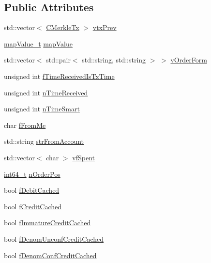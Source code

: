 \subsection*{Public Attributes}
\begin{DoxyCompactItemize}
\item 
std\+::vector$<$ \hyperlink{class_c_merkle_tx}{C\+Merkle\+Tx} $>$ \hyperlink{class_c_wallet_tx_ae122d2e0ce296bd9dfc63eb3ede5ce98}{vtx\+Prev}
\item 
\hyperlink{wallet_8h_ab1e69952accb0e7c635e4d7f2b19802b}{map\+Value\+\_\+t} \hyperlink{class_c_wallet_tx_a17229eca0c81245312115a9c333203d8}{map\+Value}
\item 
std\+::vector$<$ std\+::pair$<$ std\+::string, std\+::string $>$ $>$ \hyperlink{class_c_wallet_tx_a923dbbba343b8f4d1c3d89ae73bdcea0}{v\+Order\+Form}
\item 
unsigned int \hyperlink{class_c_wallet_tx_ac058c61be3a1c680a3ad384ff04d27eb}{f\+Time\+Received\+Is\+Tx\+Time}
\item 
unsigned int \hyperlink{class_c_wallet_tx_af4f4b58875061467026da7b259532b69}{n\+Time\+Received}
\item 
unsigned int \hyperlink{class_c_wallet_tx_a3c9ba52ce7203b9f16235785a09c383c}{n\+Time\+Smart}
\item 
char \hyperlink{class_c_wallet_tx_a1598bf4a18fd05ce5eaaa0c3eb58ff28}{f\+From\+Me}
\item 
std\+::string \hyperlink{class_c_wallet_tx_a099b5ca562f8a8378124b345b9123f25}{str\+From\+Account}
\item 
std\+::vector$<$ char $>$ \hyperlink{class_c_wallet_tx_a32c09e049302518c81f80c4f1f85583b}{vf\+Spent}
\item 
\hyperlink{stdint_8h_adec1df1b8b51cb32b77e5b86fff46471}{int64\+\_\+t} \hyperlink{class_c_wallet_tx_af51e160ff1d9d78986e9f239c7ac7a35}{n\+Order\+Pos}
\item 
bool \hyperlink{class_c_wallet_tx_ad2dca68c99f2e677e5999c9872a269da}{f\+Debit\+Cached}
\item 
bool \hyperlink{class_c_wallet_tx_ad896ca73e00251f900185a1114c3c506}{f\+Credit\+Cached}
\item 
bool \hyperlink{class_c_wallet_tx_a9f52bb55d93a7ffe20e93a4f12487815}{f\+Immature\+Credit\+Cached}
\item 
bool \hyperlink{class_c_wallet_tx_a11197a5edda9bbfa66fe94eab1329a51}{f\+Denom\+Unconf\+Credit\+Cached}
\item 
bool \hyperlink{class_c_wallet_tx_a73a6308df83f13853a1891ef67c2d199}{f\+Denom\+Conf\+Credit\+Cached}

\end{DoxyCompactItemize}
